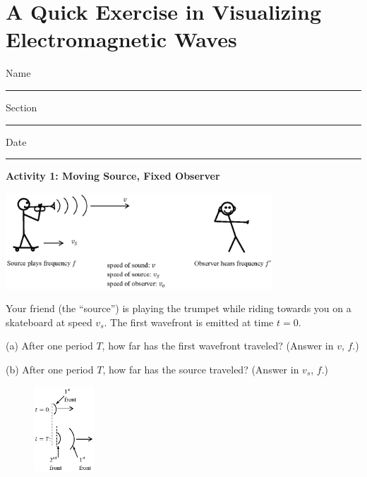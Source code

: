 \section{A Quick Exercise in Visualizing Electromagnetic Waves}

Name \rule{2.0in}{0.1pt}\hfill{}Section \rule{1.0in}{0.1pt}\hfill{}Date
\rule{1.0in}{0.1pt}

\vspace{0.1in}
%


\textbf{Activity 1: Moving Source, Fixed Observer}

\begin{center}
\includegraphics[width=0.75\textwidth]{doppler_shift/moving_source.eps}
\end{center}

Your friend (the ``source'') is playing the trumpet while riding towards you on a skateboard at speed $v_s$.  The first wavefront is emitted at time $t=0$.

(a) After one period $T$, how far has the first wavefront traveled?  (Answer in $v$, $f$.)
\vspace{1.0in}

(b) After one period $T$, how far has the source traveled? (Answer in $v_s$, $f$.)
\vspace{1.0in}

\begin{figure}
    \vspace{-0.9 in}
\includegraphics[width=0.2\textwidth]{doppler_shift/front_motion.eps}
\end{figure}

